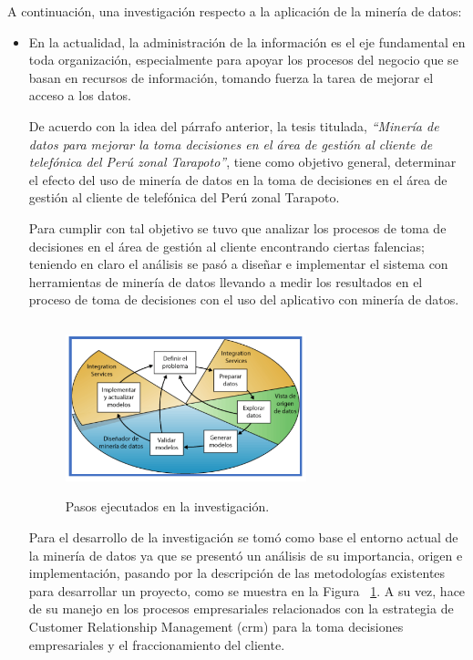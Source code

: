 \documentclass[10pt,journal]{IEEEtran}
\begin{document}
    A continuación, una investigación respecto a la aplicación de la minería de datos:
    \begin{itemize}
        \item  En la actualidad, la administración de la información es el eje fundamental en toda organización, especialmente para apoyar los procesos del negocio que se basan en recursos de información, tomando fuerza la tarea de mejorar el acceso a los datos. 
        
        De acuerdo con la idea del párrafo anterior, la tesis titulada, \textit{“Minería de datos para mejorar la toma decisiones en el área de gestión al cliente de telefónica del Perú zonal Tarapoto”}, \citep{uriarte} tiene como objetivo general, determinar el efecto del uso de minería de datos en la toma de decisiones en el área de gestión al cliente de telefónica del Perú zonal Tarapoto. 
        
        Para cumplir con tal objetivo se tuvo que analizar los procesos de toma de decisiones en el área de gestión al cliente encontrando ciertas falencias; teniendo en claro el análisis se pasó a diseñar e implementar el sistema con herramientas de minería de datos llevando a medir los resultados en el proceso de toma de decisiones con el uso del aplicativo con minería de datos.
        
        \begin{figure}[H]
      \begin{center}
        \includegraphics[width=7cm, height=5cm]{figuras/mininv.PNG}
        \caption{Pasos ejecutados en la investigación.}
        \label{mininv} 
        \end{center}
    \end{figure}  
        
         Para el desarrollo de la investigación se tomó como base el entorno actual de la minería de datos ya que se presentó un análisis de su importancia, origen e implementación, pasando por la descripción de las metodologías existentes para desarrollar un proyecto, como se muestra en la Figura ~\ref{mininv}. A su vez, hace de su manejo en los procesos empresariales relacionados con la estrategia de Customer Relationship Management (crm) para la toma decisiones empresariales y el fraccionamiento del cliente.
         

\end{itemize}
\end{document}
